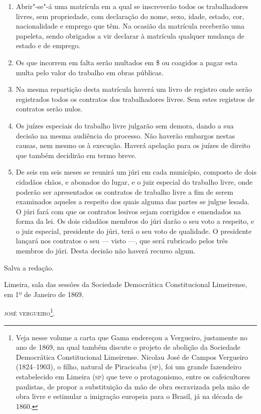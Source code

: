 \begin{enumerate}[label=Art. \arabic*º]
\begin{enumerate}[label=§ \arabic*º]
\item Abrir"-se"-á uma matrícula em a qual se inscreverão todos os
trabalhadores livres, sem propriedade, com declaração do nome, sexo,
idade, estado, cor, nacionalidade e emprego que têm. Na ocasião da
matrícula receberão uma papeleta, sendo obrigados a vir declarar à
matrícula qualquer mudança de estado e de emprego.

\item Os que incorrem em falta serão multados em \$ ou coagidos a pagar
esta multa pelo valor do trabalho em obras públicas.

\item Na mesma repartição desta matrícula haverá um livro de registro
onde serão registrados todos os contratos dos trabalhadores livres. Sem
estes registros de contratos serão nulos.

\item Os juízes especiais do trabalho livre julgarão sem demora, dando a
sua decisão na mesma audiência do processo. Não haverão embargos nestas
causas, nem mesmo os à execução. Haverá apelação para os juízes de
direito que também decidirão em termo breve.

\item De seis em seis meses se reunirá um júri em cada município,
composto de dois cidadãos chãos, e abonados do lugar, e o juiz especial
do trabalho livre, onde poderão ser apresentados os contratos de
trabalho livre a fim de serem examinados aqueles a respeito dos quais
alguma das partes se julgue lesada. O júri fará com que os contratos
lesivos sejam corrigidos e emendados na forma da lei. Os dois cidadãos
membros do júri darão o seu voto a respeito, e o juiz especial,
presidente do júri, terá o seu voto de qualidade. O presidente lançará
nos contratos o seu --- visto ---, que será rubricado pelos três
membros do júri. Desta decisão não haverá recurso algum.
\end{enumerate}
\end{enumerate}

Salva a redação.

Limeira, sala das sessões da Sociedade Democrática Constitucional
Limeirense, em 1º de Janeiro de 1869.

\hfill\textsc{josé vergueiro}\footnote{Veja nesse volume a carta que Gama endereçou a
  Vergueiro, justamente no ano de 1869, na qual também discute o
  projeto de abolição da Sociedade Democrática Constitucional
  Limeirense. Nicolau José de Campos Vergueiro (1824--1903), o filho,
  natural de Piracicaba (\textsc{sp}), foi um grande fazendeiro estabelecido em
  Limeira (\textsc{sp}) que teve o protagonismo, entre os cafeicultores
  paulistas, de propor a substituição da mão de obra escravizada pela
  mão de obra livre e estimular a imigração europeia para o Brasil, já
  na década de 1860.}.\bigskip


